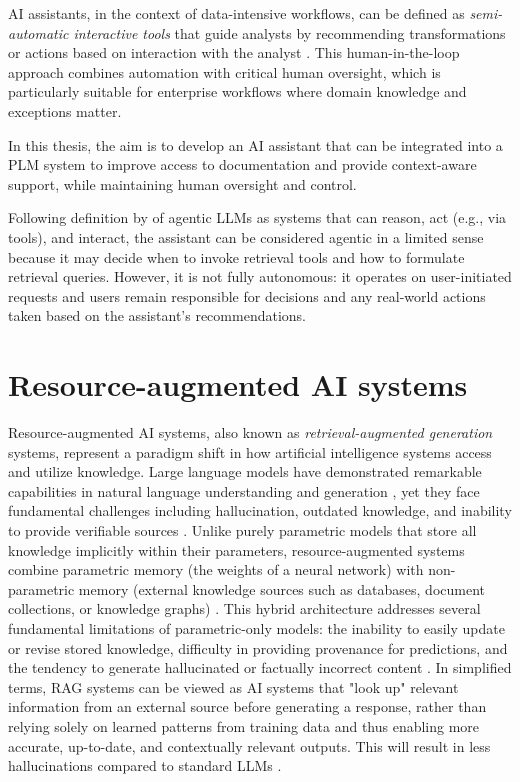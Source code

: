 AI assistants, in the context of data-intensive workflows, can be defined as \textit{semi-automatic interactive tools} that guide analysts by recommending transformations or actions based on interaction with the analyst \parencite{petricekAIAssistantsFramework2023}. This human-in-the-loop approach combines automation with critical human oversight, which is particularly suitable for enterprise workflows where domain knowledge and exceptions matter.

In this thesis, the aim is to develop an AI assistant that can be integrated into a PLM system to improve access to documentation and provide context-aware support, while maintaining human oversight and control.

Following definition by \parencite{plaatAgenticLargeLanguage2026} of agentic LLMs as systems that can reason, act (e.g., via tools), and interact, the assistant can be considered agentic in a limited sense because it may decide when to invoke retrieval tools and how to formulate retrieval queries. However, it is not fully autonomous: it operates on user-initiated requests and users remain responsible for decisions and any real-world actions taken based on the assistant's recommendations.

\section{Resource-augmented AI systems}
\label{sec:resource-augmented-ai-systems}

Resource-augmented AI systems, also known as \emph{retrieval-augmented generation} systems, represent a paradigm shift in how artificial intelligence systems access and utilize knowledge. Large language models have demonstrated remarkable capabilities in natural language understanding and generation \parencite{zhaoSurveyLargeLanguage2025}, yet they face fundamental challenges including hallucination, outdated knowledge, and inability to provide verifiable sources \parencite{gaoRetrievalAugmentedGenerationLarge2024}. Unlike purely parametric models that store all knowledge implicitly within their parameters, resource-augmented systems combine parametric memory (the weights of a neural network) with non-parametric memory (external knowledge sources such as databases, document collections, or knowledge graphs) \parencite{NEURIPS2020_6b493230}. This hybrid architecture addresses several fundamental limitations of parametric-only models: the inability to easily update or revise stored knowledge, difficulty in providing provenance for predictions, and the tendency to generate hallucinated or factually incorrect content \parencite{NEURIPS2020_6b493230}. In simplified terms, RAG systems can be viewed as AI systems that "look up" relevant information from an external source before generating a response, rather than relying solely on learned patterns from training data and thus enabling more accurate, up-to-date, and contextually relevant outputs. This will result in less hallucinations compared to standard LLMs \parencite{NEURIPS2020_6b493230}.

